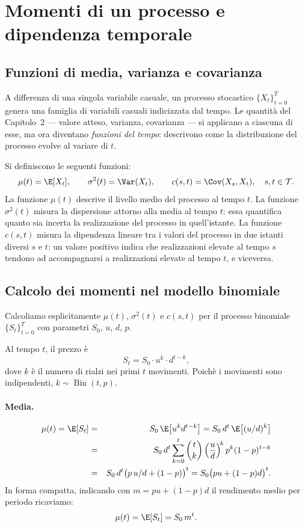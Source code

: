 \section{Momenti di un processo e dipendenza temporale}

\subsection{Funzioni di media, varianza e covarianza}

A differenza di una singola variabile casuale, un processo stocastico
$\{X_t\}_{t=0}^{T}$ genera una famiglia di variabili casuali indicizzata
dal tempo. Le quantit\`{a} del Capitolo~2 --- valore atteso, varianza,
covarianza --- si applicano a ciascuna di esse, ma ora diventano
\emph{funzioni del tempo}: descrivono come la distribuzione del processo
evolve al variare di $t$.

Si definiscono le seguenti funzioni:
\[
\mu(t)=\E[X_t], \qquad
\sigma^2(t)=\Var(X_t), \qquad
c(s,t)=\Cov(X_s,X_t), \quad s,t\in\mathcal{T}.
\]
La funzione $\mu(t)$ descrive il livello medio del processo al tempo $t$.
La funzione $\sigma^2(t)$ misura la dispersione attorno alla media al
tempo $t$: essa quantifica quanto sia incerta la realizzazione del
processo in quell'istante. La funzione $c(s,t)$ misura la dipendenza
lineare tra i valori del processo in due istanti diversi $s$ e $t$:
un valore positivo indica che realizzazioni elevate al tempo $s$ tendono
ad accompagnarsi a realizzazioni elevate al tempo $t$, e viceversa.

\subsection{Calcolo dei momenti nel modello binomiale}

Calcoliamo esplicitamente $\mu(t)$, $\sigma^2(t)$ e $c(s,t)$ per il
processo binomiale $\{S_t\}_{t=0}^{T}$ con parametri $S_0$, $u$, $d$,
$p$.

Al tempo $t$, il prezzo \`{e}
\[
S_t = S_0\cdot u^{k}\cdot d^{t-k},
\]
dove $k$ \`{e} il numero di rialzi nei primi $t$ movimenti. Poich\`{e}
i movimenti sono indipendenti, $k\sim\operatorname{Bin}(t,p)$.

\paragraph{Media.}
\begin{eqnarray*}
\mu(t)=\E[S_t]
&=& S_0\,\E\bigl[u^{k}d^{t-k}\bigr]
= S_0\,d^t\,\E\bigl[(u/d)^{k}\bigr]\\
&=& S_0\,d^t\sum_{k=0}^{t}\binom{t}{k}
    \left(\frac{u}{d}\right)^{\!k}p^k(1-p)^{t-k}\\
&=& S_0\,d^t\bigl(p\,u/d+(1-p)\bigr)^t
= S_0\bigl(pu+(1-p)d\bigr)^t.
\end{eqnarray*}
In forma compatta, indicando con $m=pu+(1-p)d$ il rendimento medio
per periodo ricaviamo:
\[
\mu(t)=\E[S_t]=S_0\,m^t.
\]

